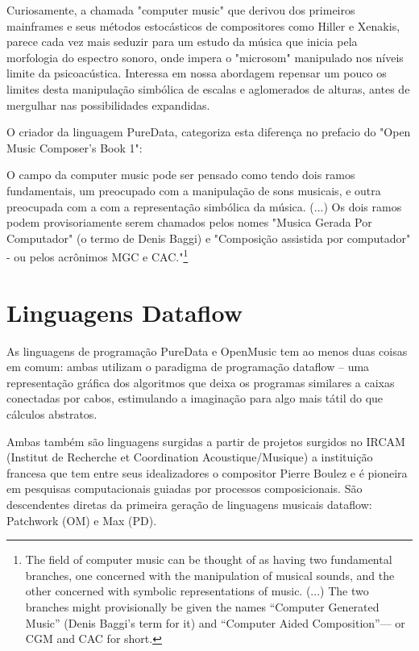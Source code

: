 \documentclass[
	12pt,				%
	openright,			%
	twoside,			%
	a4paper,			%
	english,			%
	french,				%
	spanish,			%
	brazil				%
	]{abntex2}
\begin{document}
Curiosamente, a chamada "computer music"\cite{curtis1996computer} que derivou dos primeiros mainframes e seus métodos estocásticos de compositores como Hiller e Xenakis, parece cada vez mais seduzir para um estudo da música que inicia pela morfologia do espectro sonoro, onde impera o "microsom"\cite{roads2004microsound} manipulado nos níveis limite da psicoacústica. Interessa em nossa abordagem repensar um pouco os limites desta manipulação simbólica de escalas e aglomerados de alturas, antes de mergulhar nas possibilidades expandidas. 

O criador da linguagem PureData, categoriza esta diferença no prefacio do "Open Music Composer's Book 1"\cite{OM_book01_2006}:

\begin{citacao}
O campo da computer music pode ser pensado como tendo dois ramos fundamentais, um preocupado com a manipulação de sons musicais, e outra preocupada com a com a representação simbólica da música. (...) Os dois ramos podem provisoriamente serem chamados pelos nomes "Musica Gerada Por Computador" (o termo de Denis Baggi) e "Composição assistida por computador" - ou pelos acrônimos MGC e CAC."\cite[pg. ix]{puckettecomputing}\footnote{
The field of computer music can be thought of as having two fundamental branches, one concerned with the manipulation of musical sounds, and the other concerned with symbolic representations of music. (...) The two branches might provisionally be given the names “Computer Generated Music” (Denis Baggi’s term for it) and “Computer Aided Composition”— or CGM and CAC for short.\cite[pg. ix]{puckettecomputing}}

\end{citacao}




\section{Linguagens Dataflow}
\label{ferramentas}

As linguagens de programação PureData e OpenMusic tem ao menos duas coisas em comum: ambas utilizam o paradigma de programação dataflow – uma representação gráfica dos algoritmos que deixa os programas similares a caixas conectadas por cabos, estimulando a imaginação para algo mais tátil do que cálculos abstratos.

Ambas também são linguagens surgidas a partir de projetos surgidos no IRCAM (Institut de Recherche et Coordination Acoustique/Musique) a instituição francesa que tem entre seus idealizadores o compositor Pierre Boulez e é pioneira em pesquisas computacionais guiadas por processos composicionais. São descendentes diretas da primeira geração de linguagens musicais dataflow: Patchwork (OM) e Max (PD).
\end{document}

